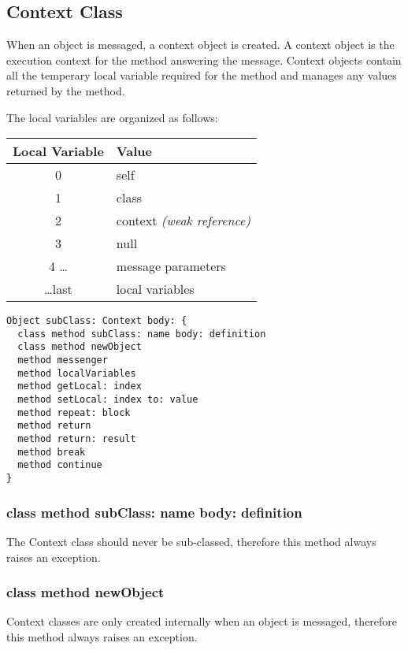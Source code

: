 \subsection {Context Class}

When an object is messaged, a context object is created. A context object is the execution context for the method answering the message. Context objects contain all the temperary local variable required for the method and manages any values returned by the method.

The local variables are organized as follows:

\begin{center}
  \begin{tabular}{ c | l }
  	Local Variable & Value                             \\ \hline
  	0              & self                              \\
  	1              & class                             \\
  	2              & context \textit{(weak reference)} \\
  	3              & null                              \\
  	4 \dots        & message parameters                \\
  	\dots last     & local variables
  \end{tabular}
\end{center}

\begin{lstlisting}
Object subClass: Context body: {
  class method subClass: name body: definition
  class method newObject
  method messenger
  method localVariables
  method getLocal: index
  method setLocal: index to: value
  method repeat: block
  method return
  method return: result
  method break
  method continue
}
\end{lstlisting}

\subsubsection {class method subClass: name body: definition}
The Context class should never be sub-classed, therefore this method always raises an exception.

\subsubsection {class method newObject}
Context classes are only created internally when an object is messaged, therefore this method always raises an exception.

